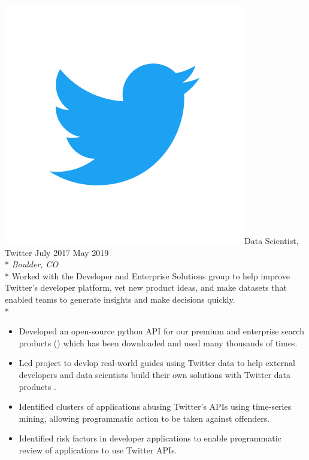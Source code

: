 \documentclass[print]{friggeri-cv} %
\newcommand{\twittericon}{\includegraphics[scale=0.05]{Twitter_Logo_Blue.png}}%
\begin{document}
\begin{description} \itemsep1pt \parskip0pt 
  \item \twittericon {\largeheaderfont Data Scientist, Twitter } \hfill
    {\smallheaderfont July 2017 \textemdash  May 2019}\\*
    {\footnotesize \emph{Boulder, CO}} \\*
    Worked with the Developer and Enterprise Solutions group to help improve
    Twitter's developer platform, vet new product ideas, and make datasets that
    enabled teams to generate insights and make decisions quickly.\\*
    \begin{itemize} \itemsep0.5pt \parskip0pt 
      \item Developed an open-source python API for our premium and enterprise search
          products (\cite{search_tweets_python}) which has been downloaded and used 
          many thousands of times.

      \item Led project to devlop real-world guides using Twitter data to
      help external developers and data scientists build their own solutions
      with Twitter data products \cite{do_more_with_twtter_data}.

      \item Identified clusters of applications abusing Twitter's APIs using time-series mining, allowing
      programmatic action to be taken against offenders.

      \item Identified risk factors in developer applications to enable programmatic
            review of applications to use Twitter APIs.

    \end{itemize}
\end{description}
\end{document}
